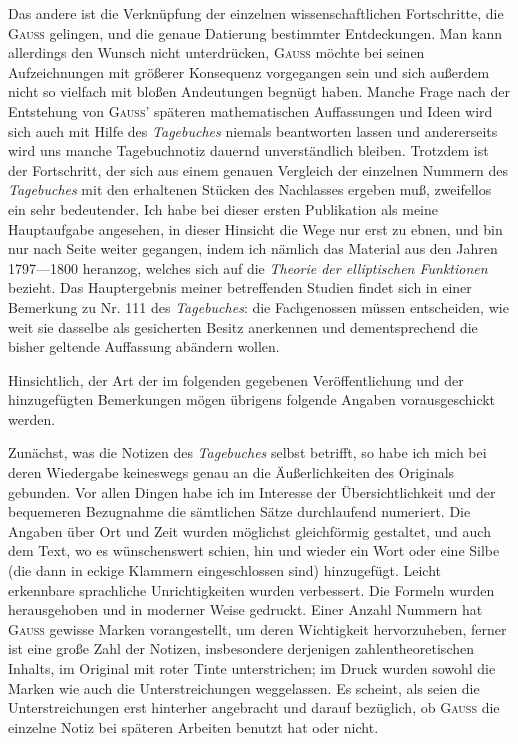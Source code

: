 \indent Das andere ist die Verknüpfung der einzelnen wissenschaftlichen Fortschritte, die \textsc{Gauss} gelingen, und die genaue Datierung bestimmter Entdeckungen. Man kann allerdings den Wunsch nicht unterdrücken, \textsc{Gauss} möchte bei seinen Aufzeichnungen mit größerer Konsequenz vorgegangen sein und sich außerdem nicht so vielfach mit bloßen Andeutungen begnügt haben. Manche Frage nach der Entstehung von \textsc{Gauss}' späteren mathematischen Auffassungen und Ideen wird sich auch mit Hilfe des \textit{Tagebuches} niemals beantworten lassen und andererseits wird uns manche Tagebuchnotiz dauernd unverständlich bleiben. Trotzdem ist der Fortschritt, der sich aus einem genauen Vergleich der einzelnen Nummern des \textit{Tagebuches} mit den erhaltenen Stücken des Nachlasses ergeben muß, zweifellos ein sehr bedeutender. Ich habe bei dieser ersten Publikation als meine Hauptaufgabe angesehen, in dieser Hinsicht die Wege nur erst zu ebnen, und bin nur nach  Seite weiter gegangen, indem ich nämlich das Material aus den Jahren 1797—1800 heranzog, welches sich auf die \textit{Theorie der elliptischen Funktionen} bezieht. Das Hauptergebnis meiner betreffenden Studien findet sich in einer Bemerkung zu Nr. 111 des \textit{Tagebuches}: die Fachgenossen müssen entscheiden, wie weit sie dasselbe als gesicherten Besitz anerkennen und dementsprechend die bisher geltende Auffassung abändern wollen.

\indent Hinsichtlich, der Art der im folgenden gegebenen Veröffentlichung und der hinzugefügten Bemerkungen mögen übrigens folgende Angaben vorausgeschickt werden.

\indent Zunächst, was die Notizen des \textit{Tagebuches} selbst betrifft, so habe ich mich bei deren Wiedergabe keineswegs genau an die Äußerlichkeiten des Originals gebunden. Vor allen Dingen habe ich im Interesse der Übersichtlichkeit und der bequemeren Bezugnahme die sämtlichen Sätze durchlaufend numeriert. Die Angaben über Ort und Zeit wurden möglichst gleichförmig gestaltet, und auch dem Text, wo es wünschenswert schien, hin und wieder ein Wort oder eine Silbe (die dann in eckige Klammern eingeschlossen sind) hinzugefügt. Leicht erkennbare sprachliche Unrichtigkeiten wurden verbessert. Die Formeln wurden herausgehoben und in moderner Weise gedruckt. Einer Anzahl Nummern hat \textsc{Gauss} gewisse Marken vorangestellt, um deren Wichtigkeit hervorzuheben, ferner ist eine große Zahl der Notizen, insbesondere derjenigen zahlentheoretischen Inhalts, im Original mit roter Tinte unterstrichen; im Druck wurden sowohl die Marken wie auch die Unterstreichungen weggelassen. Es scheint, als seien die Unterstreichungen erst hinterher angebracht und darauf bezüglich, ob \textsc{Gauss} die einzelne Notiz bei späteren Arbeiten benutzt hat oder nicht.

